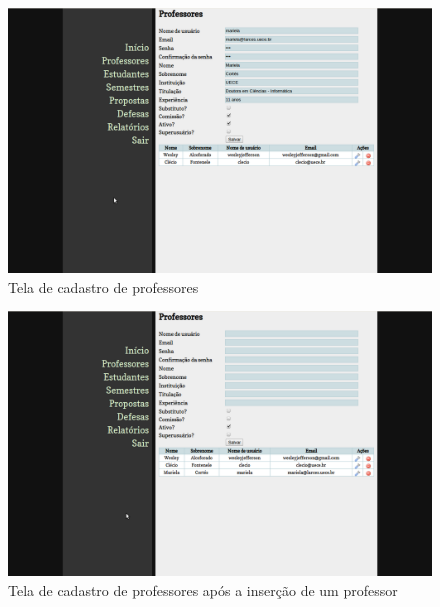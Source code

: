 \begin{figure}[htbp]
\centering
\includegraphics[width=1\textwidth]{fig/telas/administrador/crud_professor_insercao.png}
\caption{Tela de cadastro de professores}
\label{fig:crud_professor_insercao}
\end{figure}

\begin{figure}[htbp]
\centering
\includegraphics[width=1\textwidth]{fig/telas/administrador/crud_professor_listagem_pos_insercao.png}
\caption{Tela de cadastro de professores após a inserção de um professor}
\label{fig:crud_professor_listagem_pos_insercao}
\end{figure}

